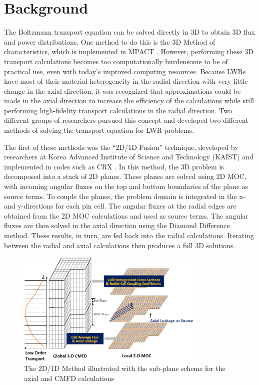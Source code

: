 \section{Background}

The Boltzmann transport equation can be solved directly in 3D to obtain 3D flux and power distributions.  One method to do this is the 3D Method of characteristics, which is implemented in MPACT \cite{KochunasThesis}.  However, performing these 3D transport calculations becomes too computationally burdensome to be of practical use, even with today's improved computing resources.  Because LWRs have most of their material heterogeneity in the radial direction with very little change in the axial direction, it was recognized that approximations could be made in the axial direction to increase the efficiency of the calculations while still performing high-fidelity transport calculations in the radial direction.  Two different groups of researchers pursued this concept and developed two different methods of solving the transport equation for LWR problems.

The first of these methods was the ``2D/1D Fusion'' technique, developed by researchers at Korea Advanced Institute of Science and Technology (KAIST) and implemented in codes such as CRX \cite{Fusion2D1D,FusionMOC}.  In this method, the 3D problem is decomposed into a stack of 2D planes.  These planes are solved using 2D MOC, with incoming angular fluxes on the top and bottom boundaries of the plane as source terms.  To couple the planes, the problem domain is integrated in the x- and y-directions for each pin cell.  The angular fluxes at the radial edges are obtained from the 2D MOC calculations and used as source terms.  The angular fluxes are then solved in the axial direction using the Diamond Difference method.  These results, in turn, are fed back into the radial calculations.  Iterating between the radial and axial calculations then produces a full 3D solutions.

\begin{figure}[h]
    \centering
    \includegraphics[width=0.8\textwidth]{../figs/2d1d-subplane.png}
    \caption[2D/1D Illustration]{The 2D/1D Method illustrated with the sub-plane scheme for the axial and CMFD calculations}
    \label{f:2d1dsubpalne}
\end{figure}

